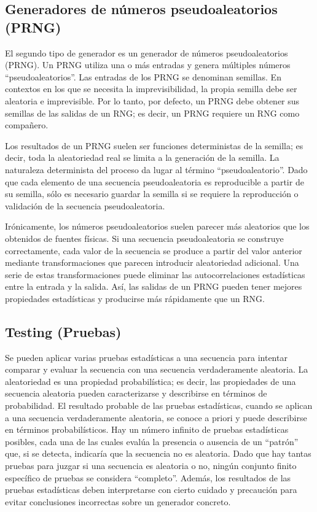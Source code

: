 	\subsection{Generadores de números pseudoaleatorios (PRNG)}
	
	El segundo tipo de generador es un generador de números pseudoaleatorios (PRNG). Un PRNG utiliza una o más entradas y genera múltiples números ``pseudoaleatorios''. Las entradas de los PRNG se denominan semillas. En contextos en los que se necesita la imprevisibilidad, la propia semilla debe ser aleatoria e imprevisible. Por lo tanto, por defecto, un PRNG debe obtener sus semillas de las salidas de un RNG; es decir, un PRNG requiere un RNG como compañero.
	
	Los resultados de un PRNG suelen ser funciones deterministas de la semilla; es decir, toda la aleatoriedad real se limita a la generación de la semilla. La naturaleza determinista del proceso da lugar al término ``pseudoaleatorio''. Dado que cada elemento de una secuencia pseudoaleatoria es reproducible a partir de su semilla, sólo es necesario guardar la semilla si se requiere la reproducción o validación de la secuencia pseudoaleatoria.
	
	Irónicamente, los números pseudoaleatorios suelen parecer más aleatorios que los obtenidos de fuentes físicas. Si una secuencia pseudoaleatoria se construye correctamente, cada valor de la secuencia se produce a partir del valor anterior mediante transformaciones que parecen introducir aleatoriedad adicional. Una serie de estas transformaciones puede eliminar las autocorrelaciones estadísticas entre la entrada y la salida. Así, las salidas de un PRNG pueden tener mejores propiedades estadísticas y producirse más rápidamente que un RNG.
	
	\subsection{Testing (Pruebas) }
	
	Se pueden aplicar varias pruebas estadísticas a una secuencia para intentar comparar y evaluar la secuencia con una secuencia verdaderamente aleatoria. La aleatoriedad es una propiedad probabilística; es decir, las propiedades de una secuencia aleatoria pueden caracterizarse y describirse en términos de probabilidad. El resultado probable de las pruebas estadísticas, cuando se aplican a una secuencia verdaderamente aleatoria, se conoce a priori y puede describirse en términos probabilísticos. Hay un número infinito de pruebas estadísticas posibles, cada una de las cuales evalúa la presencia o ausencia de un ``patrón'' que, si se detecta, indicaría que la secuencia no es aleatoria. Dado que hay tantas pruebas para juzgar si una secuencia es aleatoria o no, ningún conjunto finito específico de pruebas se considera ``completo''. Además, los resultados de las pruebas estadísticas deben interpretarse con cierto cuidado y precaución para evitar conclusiones incorrectas sobre un generador concreto.
	
